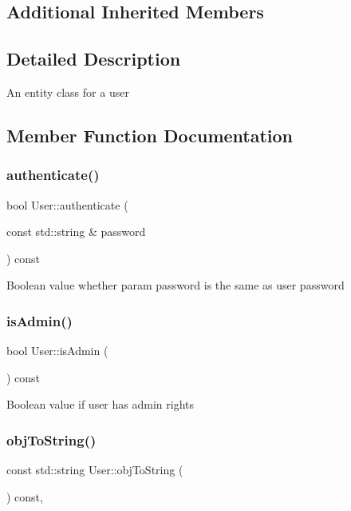 \subsection*{Additional Inherited Members}


\subsection{Detailed Description}
An entity class for a user 

\subsection{Member Function Documentation}
\mbox{\label{classUser_abc59adb4249ad4e6d521d118e6dc96e1}} 
\subsubsection{\texorpdfstring{authenticate()}{authenticate()}}
{\footnotesize\ttfamily bool User\+::authenticate (\begin{DoxyParamCaption}\item[{const std\+::string \&}]{password }\end{DoxyParamCaption}) const}

Boolean value whether param password is the same as user password \mbox{\label{classUser_a149f362a527d2d6024b15bd99e075f40}} 
\subsubsection{\texorpdfstring{is\+Admin()}{isAdmin()}}
{\footnotesize\ttfamily bool User\+::is\+Admin (\begin{DoxyParamCaption}{ }\end{DoxyParamCaption}) const}

Boolean value if user has admin rights \mbox{\label{classUser_a941a44ea8fc61a10d918566e2afc7cbc}} 
\subsubsection{\texorpdfstring{obj\+To\+String()}{objToString()}}
{\footnotesize\ttfamily const std\+::string User\+::obj\+To\+String (\begin{DoxyParamCaption}{ }\end{DoxyParamCaption}) const\hspace{0.3cm}{\ttfamily [override]}, {\ttfamily [virtual]}}


